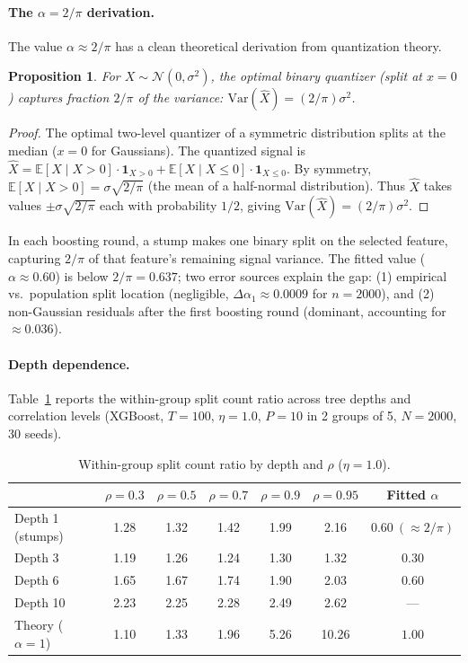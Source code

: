 \documentclass{article}
\newtheorem{proposition}[theorem]{Proposition}
\newcommand{\E}{\mathbb{E}}
\newcommand{\Var}{\mathrm{Var}}
\begin{document}
\paragraph{The $\alpha = 2/\pi$ derivation.}
The value $\alpha \approx 2/\pi$ has a clean theoretical derivation from quantization theory.

\begin{proposition}
For $X \sim \mathcal{N}(0, \sigma^2)$, the optimal binary quantizer (split at $x = 0$) captures fraction $2/\pi$ of the variance: $\Var(\hat{X}) = (2/\pi)\sigma^2$.
\end{proposition}

\begin{proof}
The optimal two-level quantizer of a symmetric distribution splits at the median ($x = 0$ for Gaussians). The quantized signal is $\hat{X} = \E[X \mid X > 0] \cdot \mathbf{1}_{X > 0} + \E[X \mid X \leq 0] \cdot \mathbf{1}_{X \leq 0}$. By symmetry, $\E[X \mid X > 0] = \sigma\sqrt{2/\pi}$ (the mean of a half-normal distribution). Thus $\hat{X}$ takes values $\pm\sigma\sqrt{2/\pi}$ each with probability $1/2$, giving $\Var(\hat{X}) = (2/\pi)\sigma^2$.
\end{proof}

In each boosting round, a stump makes one binary split on the selected feature, capturing $2/\pi$ of that feature's remaining signal variance. The fitted value ($\alpha \approx 0.60$) is below $2/\pi = 0.637$; two error sources explain the gap: (1) empirical vs.\ population split location (negligible, $\Delta\alpha_1 \approx 0.0009$ for $n = 2000$), and (2) non-Gaussian residuals after the first boosting round (dominant, accounting for $\approx 0.036$).

\paragraph{Depth dependence.}
Table~\ref{tab:depth-rho} reports the within-group split count ratio
across tree depths and correlation levels (XGBoost, $T{=}100$, $\eta{=}1.0$,
$P{=}10$ in 2 groups of 5, $N{=}2000$, 30 seeds).

\begin{table}[t]
\centering
\caption{Within-group split count ratio by depth and $\rho$ ($\eta{=}1.0$).}
\label{tab:depth-rho}
\small
\begin{tabular}{@{}lcccccc@{}}
\toprule
 & $\rho{=}0.3$ & $\rho{=}0.5$ & $\rho{=}0.7$ & $\rho{=}0.9$ & $\rho{=}0.95$ & Fitted $\alpha$ \\
\midrule
Depth 1 (stumps) & 1.28 & 1.32 & 1.42 & 1.99 & 2.16 & $0.60\ (\approx 2/\pi)$ \\
Depth 3          & 1.19 & 1.26 & 1.24 & 1.30 & 1.32 & $0.30$ \\
Depth 6          & 1.65 & 1.67 & 1.74 & 1.90 & 2.03 & $0.60$ \\
Depth 10         & 2.23 & 2.25 & 2.28 & 2.49 & 2.62 & --- \\
\midrule
Theory ($\alpha{=}1$) & 1.10 & 1.33 & 1.96 & 5.26 & 10.26 & $1.00$ \\
\bottomrule
\end{tabular}
\end{table}
\end{document}
